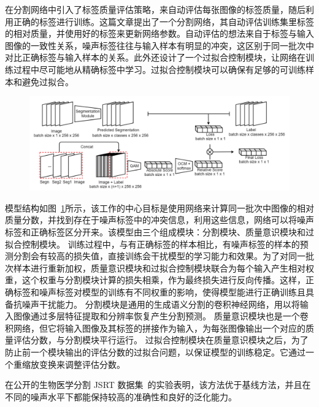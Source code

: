 \citet{Zhu2019PickandLearnAQ} 在分割网络中引入了标签质量评估策略，来自动评估每张图像的标签质量，随后利用正确的标签进行训练。这篇文章提出了一个分割网络，其自动评估训练集里标签的相对质量，并使用好的标签来更新网络参数。自动评估的想法来自于标签与输入图像的一致性关系，噪声标签往往与输入样本有明显的冲突，这区别于同一批次中对比正确标签与输入样本的关系。此外还设计了一个过拟合控制模块，让网络在训练过程中尽可能地从精确标签中学习。过拟合控制模块可以确保有足够的可训练样本和避免过拟合。
    \begin{figure}[tbp]
        \centering 
        \includegraphics[width=1.0\textwidth]{img/c2/rel_c1.png}
        \label{c2_fig11}
    \end{figure}

模型结构如图~\ref{c2_fig11}所示，该工作的中心目标是使用网络来计算同一批次中图像的相对质量分数，并找到存在于噪声标签中的冲突信息，利用这些信息，网络可以将噪声标签和正确标签区分开来。该模型由三个组成模块：分割模块、质量意识模块和过拟合控制模块。
训练过程中，与有正确标签的样本相比，有噪声标签的样本的预测分割会有较高的损失值，直接训练会干扰模型的学习能力和效果。为了对同一批次样本进行重新加权，质量意识模块和过拟合控制模块联合为每个输入产生相对权重，这个权重与分割模块计算的损失相乘，作为最终损失进行反向传播。这样，正确标签和噪声标签对模型的训练有不同权重的影响，使得模型能进行正确训练且具备抗噪声干扰能力。
分割模块是通用的生成语义分割的卷积神经网络，用以将输入图像通过多层特征提取和分辨率恢复产生分割预测。
质量意识模块也是一个卷积网络，但它将输入图像及其标签的拼接作为输入，为每张图像输出一个对应的质量评估分数，与分割模块平行运行。
过拟合控制模块在质量意识模块之后，为了防止前一个模块输出的评估分数的过拟合问题，以保证模型的训练稳定。它通过一个重缩放变换来调整评估分数。

在公开的生物医学分割 JSRT 数据集~\cite{Shiraishi2000DevelopmentOA}的实验表明，该方法优于基线方法，并且在不同的噪声水平下都能保持较高的准确性和良好的泛化能力。



